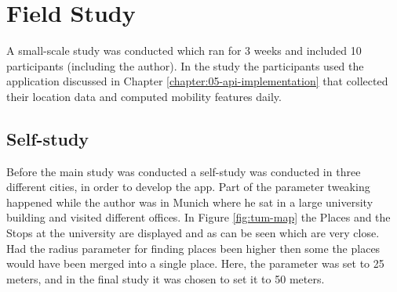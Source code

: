 \section{Field Study}
A small-scale study was conducted which ran for 3 weeks and included 10 participants (including the author). In the study the participants used the application discussed in Chapter \ref{chapter:05-api-implementation} that collected their location data and computed mobility features daily.


\subsection{Self-study}
Before the main study was conducted a self-study was conducted in three different cities, in order to develop the app. Part of the parameter tweaking happened while the author was in Munich where he sat in a large university building and visited different offices. In Figure \ref{fig:tum-map} the Places and the Stops at the university are displayed and as can be seen which are very close. Had the radius parameter for finding places been higher then some the places would have been merged into a single place. Here, the parameter was set to 25 meters, and in the final study it was chosen to set it to 50 meters.


